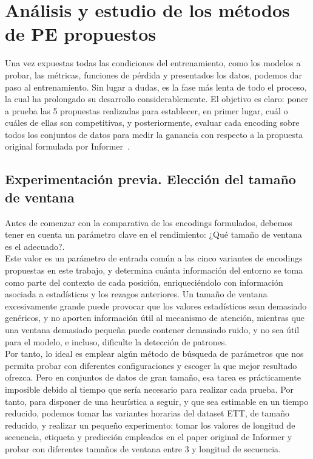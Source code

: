 \chapter{Análisis y estudio de los métodos de PE propuestos}

Una vez expuestas todas las condiciones del entrenamiento, como los modelos a probar, las métricas, funciones de pérdida y presentados los datos, podemos dar paso al entrenamiento. Sin lugar a dudas, es la fase más lenta de todo el proceso, la cual ha prolongado su desarrollo considerablemente. El objetivo es claro: poner a prueba las 5 propuestas realizadas para establecer, en primer lugar, cuál o cuáles de ellas son competitivas, y posteriormente, evaluar cada encoding sobre todos los conjuntos de datos para medir la ganancia con respecto a la propuesta original formulada por Informer~\cite{zhou2021informerefficienttransformerlong}.


\section{Experimentación previa. Elección del tamaño de ventana}

Antes de comenzar con la comparativa de los encodings formulados, debemos tener en cuenta un parámetro clave en el rendimiento: ¿Qué tamaño de ventana es el adecuado?.\\

Este valor es un parámetro de entrada común a las cinco variantes de encodings propuestas en este trabajo, y determina cuánta información del entorno se toma como parte del contexto de cada posición, enriqueciéndolo con información asociada a estadísticas y los rezagos anteriores. Un tamaño de ventana excesivamente grande puede provocar que los valores estadísticos sean demasiado genéricos, y no aporten información útil al mecanismo de atención, mientras que una ventana demasiado pequeña puede contener demasiado ruido, y no sea útil para el modelo, e incluso, dificulte la detección de patrones.\\

Por tanto, lo ideal es emplear algún método de búsqueda de parámetros que nos permita probar con diferentes configuraciones y escoger la que mejor resultado ofrezca. Pero en conjuntos de datos de gran tamaño, esa tarea es prácticamente imposible debido al tiempo que sería necesario para realizar cada prueba. Por tanto, para disponer de una heurística a seguir, y que sea estimable en un tiempo reducido, podemos tomar las variantes horarias del dataset ETT, de tamaño reducido, y realizar un pequeño experimento: tomar los valores de longitud de secuencia, etiqueta y predicción empleados en el paper original de Informer y probar con diferentes tamaños de ventana entre 3 y longitud de secuencia.\\

